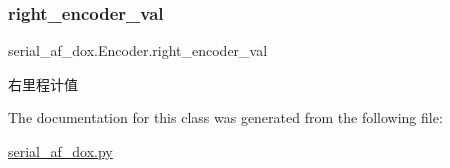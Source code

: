 \subsubsection{\texorpdfstring{right\+\_\+encoder\+\_\+val}{right\_encoder\_val}}
{\footnotesize\ttfamily serial\+\_\+af\+\_\+dox.\+Encoder.\+right\+\_\+encoder\+\_\+val}



右里程计值 



The documentation for this class was generated from the following file\+:\begin{DoxyCompactItemize}
\item 
\hyperlink{serial__af__dox_8py}{serial\+\_\+af\+\_\+dox.\+py}\end{DoxyCompactItemize}
